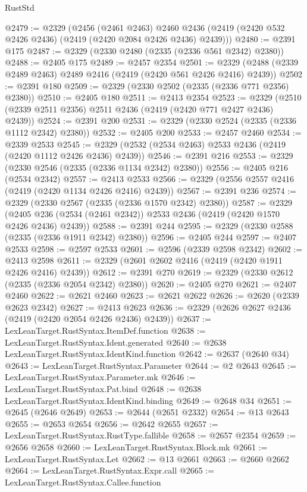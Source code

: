 \begin{lexlean}{RustStd}
\begin{coremodule}
@2479 := @2329
    (@2456
      (@2461 @2463)
      @2460
      @2436
      (@2419 (@2420 @532 @2426 @2436) (@2419 (@2420 @2084 @2426 @2436) @2439)))
@2480 := @2391 @175
@2487 := @2329 (@2330 @2480 (@2335 (@2336 @561 @2342) @2380))
@2488 := @2405 @175
@2489 := @2457 @2354
@2501 := @2329 (@2488 (@2339 @2489 @2463) @2489 @2416 (@2419 (@2420 @561 @2426 @2416) @2439))
@2502 := @2391 @180
@2509 := @2329 (@2330 @2502 (@2335 (@2336 @771 @2356) @2380))
@2510 := @2405 @180
@2511 := @2413 @2354
@2523 := @2329 (@2510 (@2339 @2511 @2356) @2511 @2436 (@2419 (@2420 @771 @2427 @2436) @2439))
@2524 := @2391 @200
@2531 := @2329 (@2330 @2524 (@2335 (@2336 @1112 @2342) @2380))
@2532 := @2405 @200
@2533 := @2457 @2460
@2534 := @2339 @2533
@2545 := @2329 (@2532 (@2534 @2463) @2533 @2436 (@2419 (@2420 @1112 @2426 @2436) @2439))
@2546 := @2391 @216
@2553 := @2329 (@2330 @2546 (@2335 (@2336 @1134 @2342) @2380))
@2556 := @2405 @216 (@2534 @2342)
@2557 := @2413 @2533
@2566 := @2329 (@2556 @2557 @2416 (@2419 (@2420 @1134 @2426 @2416) @2439))
@2567 := @2391 @236
@2574 := @2329 (@2330 @2567 (@2335 (@2336 @1570 @2342) @2380))
@2587 := @2329
    (@2405 @236 (@2534 (@2461 @2342)) @2533 @2436 (@2419 (@2420 @1570 @2426 @2436) @2439))
@2588 := @2391 @244
@2595 := @2329 (@2330 @2588 (@2335 (@2336 @1911 @2342) @2380))
@2596 := @2405 @244
@2597 := @2407 @2533
@2598 := @2597 @2533
@2601 := @2596 (@2339 @2598 @2342)
@2602 := @2413 @2598
@2611 := @2329 (@2601 @2602 @2416 (@2419 (@2420 @1911 @2426 @2416) @2439))
@2612 := @2391 @270
@2619 := @2329 (@2330 @2612 (@2335 (@2336 @2054 @2342) @2380))
@2620 := @2405 @270
@2621 := @2407 @2460
@2622 := @2621 @2460
@2623 := @2621 @2622
@2626 := @2620 (@2339 @2623 @2342)
@2627 := @2413 @2623
@2636 := @2329 (@2626 @2627 @2436 (@2419 (@2420 @2054 @2426 @2436) @2439))
@2637 := LexLeanTarget.RustSyntax.ItemDef.function
@2638 := LexLeanTarget.RustSyntax.Ident.generated
@2640 := @2638 LexLeanTarget.RustSyntax.IdentKind.function
@2642 := @2637 (@2640 @34)
@2643 := LexLeanTarget.RustSyntax.Parameter
@2644 := @2 @2643
@2645 := LexLeanTarget.RustSyntax.Parameter.mk
@2646 := LexLeanTarget.RustSyntax.Pat.bind
@2648 := @2638 LexLeanTarget.RustSyntax.IdentKind.binding
@2649 := @2648 @34
@2651 := @2645 (@2646 @2649)
@2653 := @2644 (@2651 @2332)
@2654 := @13 @2643
@2655 := @2653 @2654
@2656 := @2642 @2655
@2657 := LexLeanTarget.RustSyntax.RustType.fallible
@2658 := @2657 @2354
@2659 := @2656 @2658
@2660 := LexLeanTarget.RustSyntax.Block.mk
@2661 := LexLeanTarget.RustSyntax.Let
@2662 := @13 @2661
@2663 := @2660 @2662
@2664 := LexLeanTarget.RustSyntax.Expr.call
@2665 := LexLeanTarget.RustSyntax.Callee.function

\end{coremodule}
\end{lexlean}
